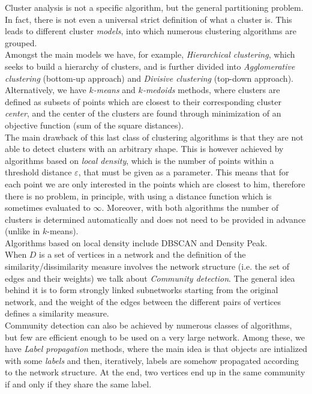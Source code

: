 \documentclass[a4paper,11pt]{book}
\begin{document}
Cluster analysis is not a specific algorithm, but the general partitioning problem. In fact, there is not even a universal strict definition of what a cluster is. This leads to different cluster \textit{models}, into which numerous clustering algorithms are grouped.\\
Amongst the main models we have, for example, \textit{Hierarchical clustering}\cite{hie}, which seeks to build a hierarchy of clusters, and is further divided into \textit{Agglomerative clustering} (bottom-up approach) and \textit{Divisive clustering} (top-down approach).\\
Alternatively, we have $k$\textit{-means} and $k$\textit{-medoids} methods, where clusters are defined as subsets of points which are closest to their corresponding cluster \textit{center}, and the center of the clusters are found through minimization of an objective function (sum of the square distances).\\
The main drawback of this last class of clustering algorithms is that they are not able to detect clusters with an arbitrary shape. This is however achieved by algorithms based on \textit{local density}, which is the number of points within a threshold distance $\varepsilon$, that must be given as a parameter. This means that for each point we are only interested in the points which
are closest to him, therefore there is no problem, in principle, with using a distance function which is sometimes evaluated to $\infty$. Moreover, with both algorithms the number of clusters is determined automatically and does not need to be provided in advance (unlike in $k$-means).\\
Algorithms based on local density include DBSCAN\cite{db} and Density Peak\cite{dp}.\\

When $D$ is a set of vertices in a network and the definition of the similarity/dissimilarity measure involves the network structure (i.e. the set of edges and their weights) we talk about \textit{Community detection}. The general idea behind it is to form strongly linked subnetworks starting from the original network, and the weight of the edges between the different pairs of vertices defines a similarity measure.\\
Community detection can also be achieved by numerous classes of algorithms\cite{commdet}, but few are efficient enough to be used on a very large network. Among these, we have \emph{Label propagation} methods, where the main idea is that objects are intialized with some \emph{labels} and then, iteratively, labels are somehow propagated according to the network structure. At the end, two vertices end up in the same community if and only if they share the same label.
\end{document}

